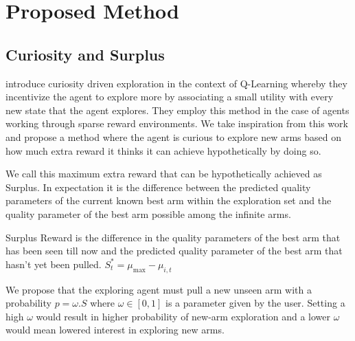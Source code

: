 \section{Proposed Method}

\subsection{Curiosity and Surplus}
 introduce curiosity driven exploration in the context of Q-Learning whereby they incentivize the agent to explore more by associating a small utility with every new state that the agent explores. They employ this method in the case of agents working through sparse reward environments. We take inspiration from this work and propose a method where the agent is curious to explore new arms based on how much extra reward it thinks it can achieve hypothetically by doing so.

We call this maximum extra reward that can be hypothetically achieved as Surplus. In expectation it is the difference between the predicted quality parameters of the current known best arm within the exploration set and the quality parameter of the best arm possible among the infinite arms.

\begin{definition}
Surplus Reward is the difference in the quality parameters of the best arm that has been seen till now and the predicted quality parameter of the best arm that hasn't yet been pulled. $S^*_t = \mu_{\max} - \mu_{i,t}$
\end{definition}

We propose that the exploring agent must pull a new unseen arm with a probability $p = \omega.S$ where $\omega \in [0,1]$ is a parameter given by the user. Setting a high $\omega$ would result in higher probability of new-arm exploration and a lower $\omega$ would mean lowered interest in exploring new arms.

